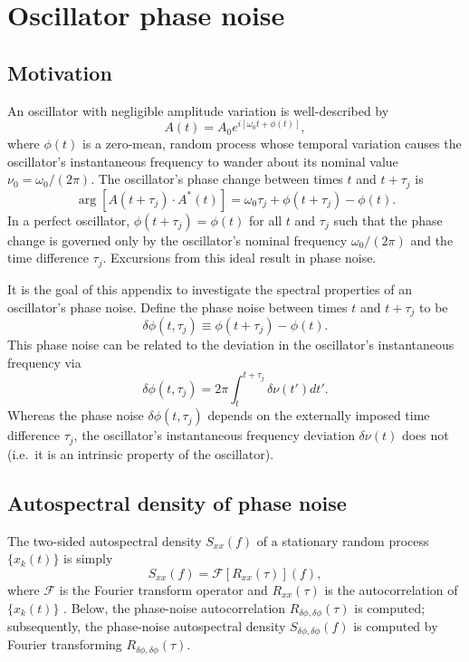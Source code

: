 \chapter{Oscillator phase noise}


\section{Motivation}
An oscillator with negligible amplitude variation is well-described by
\begin{equation}
  A(t) = A_0 e^{i [\omega_0 t + \phi(t)]},
\end{equation}
where $\phi(t)$ is a zero-mean, random process
whose temporal variation causes
the oscillator's instantaneous frequency
to wander about its nominal value $\nu_0 = \omega_0 / (2 \pi)$.
The oscillator's phase change between
times $t$ and $t + \tau_j$ is
\begin{equation}
  \arg[A(t + \tau_j) \cdot A^*(t)]
  =
  \omega_0 \tau_j + \phi(t + \tau_j) - \phi(t).
\end{equation}
In a perfect oscillator,
$\phi(t + \tau_j) = \phi(t)$ for all $t$ and $\tau_j$
such that the phase change is governed only by
the oscillator's nominal frequency $\omega_0 / (2 \pi)$ and
the time difference $\tau_j$.
Excursions from this ideal result in phase noise.

It is the goal of this appendix
to investigate the spectral properties
of an oscillator's phase noise.
Define the phase noise between times $t$ and $t + \tau_j$ to be
\begin{equation}
  \delta \phi(t, \tau_j)
  \equiv
  \phi(t + \tau_j) - \phi(t).
\end{equation}
This phase noise can be related to
the deviation in the oscillator's instantaneous frequency via
\begin{equation}
  \delta \phi(t, \tau_j)
  =
  2 \pi \int_{t}^{t + \tau_j} \delta \nu(t') dt'.
  \label{eq:OscillatorPhaseNoise:phase_noise_from_frequency_deviation}
\end{equation}
Whereas the phase noise $\delta \phi(t, \tau_j)$
depends on the externally imposed time difference $\tau_j$,
the oscillator's instantaneous frequency deviation $\delta \nu(t)$ does not
(i.e.\ it is an intrinsic property of the oscillator).


\section{Autospectral density of phase noise}
The two-sided autospectral density $S_{xx}(f)$
of a stationary random process $\{x_k(t)\}$ is simply
\begin{equation}
  S_{xx}(f) = \mathcal{F}[R_{xx}(\tau)](f),
\end{equation}
where $\mathcal{F}$ is the Fourier transform operator and
$R_{xx}(\tau)$ is the autocorrelation of $\{x_k(t)\}$
\cite{bendat_and_piersol}.
Below, the phase-noise autocorrelation
$R_{\delta\phi,\delta\phi}(\tau)$ is computed;
subsequently, the phase-noise autospectral density
$S_{\delta\phi,\delta\phi}(f)$ is computed
by Fourier transforming
$R_{\delta\phi,\delta\phi}(\tau)$.


